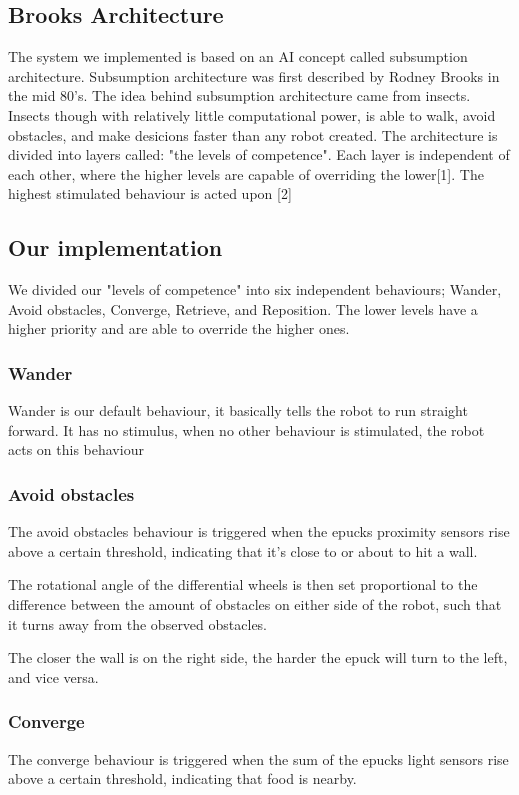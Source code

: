 \documentclass[a4paper]{article}
\begin{document}
\subsection{Brooks Architecture}
The system we implemented is based on an AI concept called subsumption architecture.
Subsumption architecture was first described by Rodney Brooks in the mid 80's.
The idea behind subsumption architecture came from insects.
Insects though with relatively little computational power, is able to walk, avoid obstacles, and make desicions faster than any robot created.
The architecture is divided into layers called: "the levels of competence".
Each layer is  independent of each other, where the higher levels are capable of overriding the lower[1].
The highest stimulated behaviour is acted upon [2]

\subsection{Our implementation}
We divided our "levels of competence" into six independent behaviours; Wander, Avoid obstacles, Converge, Retrieve, and Reposition.
The lower levels have a higher priority and are able to override the higher ones.


\subsubsection{Wander}
Wander is our default behaviour, it basically tells the robot to run straight forward.
It has no stimulus, when no other behaviour is stimulated, the robot acts on this behaviour

\subsubsection{Avoid obstacles}
The avoid obstacles behaviour is triggered when the epucks proximity sensors rise above a certain threshold, indicating that it's close to or about to hit a wall.

The rotational angle of the differential wheels is then set proportional to the difference between the amount of obstacles on either side of the robot, such that it turns away from the observed obstacles.

The closer the wall is on the right side, the harder the epuck will turn to the left, and vice versa.

\subsubsection{Converge}
The converge behaviour is triggered when the sum of the epucks light sensors rise above a certain threshold, indicating that food is nearby.
\end{document}
